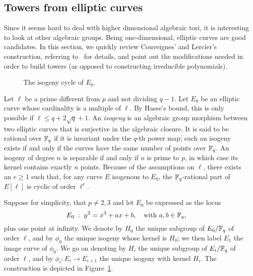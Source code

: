 \documentclass{sig-alternate}
\begin{document}

\subsection{Towers from elliptic curves}
\label{sec:elliptic}

Since it seems hard to deal with higher dimensional algebraic tori, it
is interesting to look at other algebraic groups. Being
one-dimensional, elliptic curves are good candidates. In this
section, we quickly review Couveignes' and Lercier's construction,
referring to~\cite{couveignes+lercier11} for details, and point out
the modifications needed in order to build towers (as opposed to
constructing irreducible polynomials).

\begin{figure}
  \centering
  \caption{The isogeny cycle of $E_0$.}
  \label{fig:volcano}
\end{figure}

Let $\ell$ be a prime different from $p$ and not dividing $q-1$. Let
$E_0$ be an elliptic curve whose cardinality is a multiple of
$\ell$. By Hasse's bound, this is only possible if $\ell\le q +
2\sqrt{q} + 1$.  An \emph{isogeny} is an algebraic group morphism
between two elliptic curves that is surjective in the algebraic
closure. It is said to be rational over $\mathbb{F}_q$ if it is invariant
under the $q$-th power map; such an isogeny exists if and only if the
curves have the same number of points over $\mathbb{F}_q$. An isogeny of
degree $n$ is separable if and only if $n$ is prime to $p$, in which
case its kernel contains exactly $n$ points.  Because of the
assumptions on $\ell$, there exists an $e\ge1$ such that, for any curve
$E$ isogenous to $E_0$, the $\mathbb{F}_q$-rational part of $E[\ell]$ is
cyclic of order $\ell^e$.

Suppose for simplicity, that $p\ne2,3$ and let $E_0$ be expressed as
the locus
\begin{equation}
  E_0 \;:\; y^2 = x^3 + ax + b,
  \quad\text{with $a,b\in\mathbb{F}_q$},
\end{equation}
plus one point at infinity.  We denote by $H_0$ the unique subgroup of
$E_0/\mathbb{F}_q$ of order $\ell$, and by $\phi_0$ the unique isogeny whose
kernel is $H_0$; we then label $E_1$ the image curve of $\phi_0$. We
go on denoting by $H_i$ the unique subgroup of $E_i/\mathbb{F}_q$ of order
$\ell$, and by $\phi_i:E_i\to E_{i+1}$ the unique isogeny with kernel
$H_i$. The construction is depicted in Figure~\ref{fig:volcano}.
\end{document}
